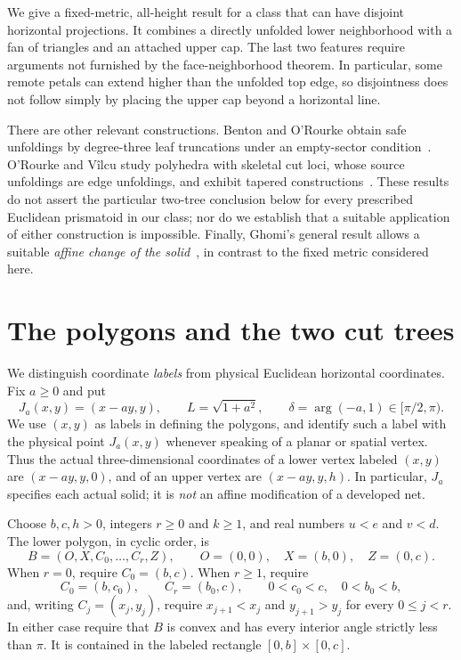 \documentclass[a4paper,11pt]{amsart}
\newcommand{\ang}{\operatorname{arg}}
\begin{document}
We give a fixed-metric, all-height result for a class that can have disjoint horizontal projections. It combines a directly unfolded lower neighborhood with a fan of triangles and an attached upper cap. The last two features require arguments not furnished by the face-neighborhood theorem. In particular, some remote petals can extend higher than the unfolded top edge, so disjointness does not follow simply by placing the upper cap beyond a horizontal line.

There are other relevant constructions. Benton and O'Rourke obtain safe unfoldings by degree-three leaf truncations under an empty-sector condition~\cite{BentonORourke2007}. O'Rourke and V\^ilcu study polyhedra with skeletal cut loci, whose source unfoldings are edge unfoldings, and exhibit tapered constructions~\cite{ORourkeVilcu2025}. These results do not assert the particular two-tree conclusion below for every prescribed Euclidean prismatoid in our class; nor do we establish that a suitable application of either construction is impossible. Finally, Ghomi's general result allows a suitable \emph{affine change of the solid}~\cite{Ghomi2014}, in contrast to the fixed metric considered here.

\section{The polygons and the two cut trees}
We distinguish coordinate \emph{labels} from physical Euclidean horizontal coordinates. Fix $a\geq0$ and put
\begin{equation}\label{eq:J}
 J_a(x,y)=(x-ay,y),\qquad L=\sqrt{1+a^2},\qquad
 \delta=\ang(-a,1)\in[\pi/2,\pi).
\end{equation}
We use $(x,y)$ as labels in defining the polygons, and identify such a label with the physical point $J_a(x,y)$ whenever speaking of a planar or spatial vertex. Thus the actual three-dimensional coordinates of a lower vertex labeled $(x,y)$ are $(x-ay,y,0)$, and of an upper vertex are $(x-ay,y,h)$. In particular, $J_a$ specifies each actual solid; it is \emph{not} an affine modification of a developed net.

Choose $b,c,h>0$, integers $r\geq0$ and $k\geq1$, and real numbers $u<e$ and $v<d$. The lower polygon, in cyclic order, is
\begin{equation}\label{eq:B}
 B=(O,X,C_0,\ldots,C_r,Z),\qquad
 O=(0,0),\quad X=(b,0),\quad Z=(0,c).
\end{equation}
When $r=0$, require $C_0=(b,c)$. When $r\geq1$, require
\[
 C_0=(b,c_0),\qquad C_r=(b_0,c),\qquad
 0<c_0<c,\quad0<b_0<b,
\]
and, writing $C_j=(x_j,y_j)$, require $x_{j+1}<x_j$ and $y_{j+1}>y_j$ for every $0\leq j<r$. In either case require that $B$ is convex and has every interior angle strictly less than $\pi$. It is contained in the labeled rectangle $[0,b]\times[0,c]$.
\end{document}
